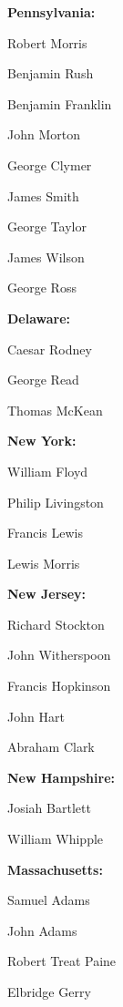 \begin{decliststates}
\item \textbf{Pennsylvania:}
\begin{declistnames}
\item Robert Morris
\item Benjamin Rush
\item Benjamin Franklin
\item John Morton
\item George Clymer
\item James Smith
\item George Taylor
\item James Wilson
\item George Ross
\end{declistnames}

\item \textbf{Delaware:}
\begin{declistnames}
\item Caesar Rodney
\item George Read
\item Thomas McKean
\end{declistnames}

\item \textbf{New York:}
\begin{declistnames}
\item William Floyd
\item Philip Livingston
\item Francis Lewis
\item Lewis Morris
\end{declistnames}

\item \textbf{New Jersey:}
\begin{declistnames}
\item Richard Stockton
\item John Witherspoon
\item Francis Hopkinson
\item John Hart
\item Abraham Clark
\end{declistnames}

\item \textbf{New Hampshire:}
\begin{declistnames}
\item Josiah Bartlett
\item William Whipple
\end{declistnames}

\item \textbf{Massachusetts:}
\begin{declistnames}
\item Samuel Adams
\item John Adams
\item Robert Treat Paine
\item Elbridge Gerry
\end{declistnames}


\end{decliststates}
